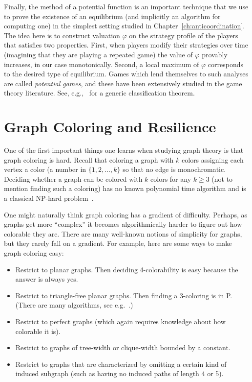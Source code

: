 Finally, the method of a potential function is an important technique that we
use to prove the existence of an equilibrium (and implicitly an algorithm for
computing one) in the simplest setting studied in
Chapter~\ref{ch:anticoordination}. The idea here is to construct valuation
$\varphi$ on the strategy profile of the players that satisfies two properties.
First, when players modify their strategies over time (imagining that they are
playing a repeated game) the value of $\varphi$ provably increases, in our case
monotonically. Second, a local maximum of $\varphi$ corresponds to the desired
type of equilibrium. Games which lend themselves to such analyses are called
\emph{potential games}, and these have been extensively studied in the game
theory literature. See, e.g.,~\cite{MondererS96} for a generic classification
theorem.

\section{Graph Coloring and Resilience}

One of the first important things one learns when studying graph theory is that
graph coloring is hard. Recall that coloring a graph with $k$ colors assigning
each vertex a color (a number in $\{ 1, 2, \dots, k \}$ so that no edge is
monochromatic. Deciding whether a graph can be colored with $k$ colors for any
$k \geq 3$ (not to mention finding such a coloring) has no known polynomial
time algorithm and is a classical NP-hard problem~\cite{GareyJ79}.  

One might naturally think graph coloring has a gradient of difficulty. Perhaps,
as graphs get more ``complex'' it becomes algorithmically harder to figure out
how colorable they are. There are many well-known notions of simplicity for
graphs, but they rarely fall on a gradient. For example, here are some ways to
make graph coloring easy:

\begin{itemize}
\item Restrict to planar graphs. Then deciding 4-colorability is easy because
the answer is always yes.~\cite{AppelH77I,AppelH77II}

\item Restrict to triangle-free planar graphs. Then finding a 3-coloring is
in P. (There are many algorithms, see e.g.~\cite{DvovrakKT11}.)

\item Restrict to perfect graphs (which again requires knowledge about how
colorable it is).\cite{GrotschelLS12,HMM10}

\item Restrict to graphs of tree-width or clique-width bounded by a
constant.~\cite{Cai03}

\item Restrict to graphs that are characterized by omitting a certain kind of
induced subgraph (such as having no induced paths of length 4 or
5).~\cite{KKTW01}
\end{itemize}


